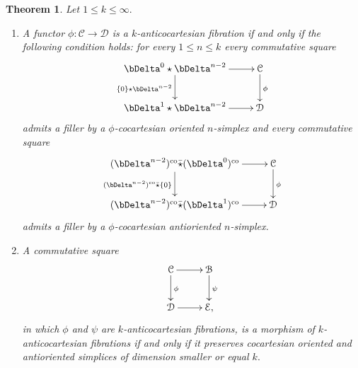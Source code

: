 \documentclass[10pt,oneside]{article}
\numberwithin{equation}{section} %
\numberwithin{figure}{section} %
\theoremstyle{plain}
\newtheorem{theorem}{Theorem}[subsection]
\theoremstyle{definition}
\newcommand{\mB}{{\mathcal B}}
\newcommand{\mC}{{\mathcal C}}
\newcommand{\mD}{{\mathcal D}}
\newcommand{\mE}{{\mathcal E}}
\newcommand{\co}{\mathrm{co}}
\begin{document}
\begin{theorem}\label{T1}
Let $1 \leq k \leq \infty.$
\begin{enumerate}[\normalfont(1)]\setlength{\itemsep}{-2pt}
\item A functor $\phi:\mC \to \mD$ is a $k$-anticocartesian fibration if and only if the following condition holds:
for every $1 \leq n \leq k$ every commutative square
\begin{equation}\label{filler0}
\begin{xy}
\xymatrix{
\bDelta^0 \star \bDelta^{n-2} \ar[d]_{\{0\}\star \bDelta^{n-2}} \ar[r]
& \mC \ar[d]^\phi
\\ 
\bDelta^1 \star \bDelta^{n-2} \ar[r] & \mD
}
\end{xy}\end{equation}
admits a filler by a $\phi$-cocartesian oriented $n$-simplex and every commutative square
\begin{equation}\label{filler1.2}
\begin{xy}
\xymatrix{(\bDelta^{n-2})^\co \bar{\star} (\bDelta^0)^\co \ar[d]_{(\bDelta^{n-2})^\co \bar{\star} \{0\}} \ar[r]
& \mC \ar[d]^\phi
\\ 
(\bDelta^{n-2})^\co \bar{\star} (\bDelta^1)^\co \ar[r] & \mD
}
\end{xy}\end{equation}
admits a filler by a $\phi$-cocartesian antioriented $n$-simplex.

\vspace{1mm}

\item A commutative square 
\begin{equation}\label{sqq}
\begin{xy}
\xymatrix{
\mC \ar[d]^\phi \ar[r]
& \mB \ar[d]^\psi
\\ 
\mD \ar[r] & \mE,
}
\end{xy}\end{equation}
in which $\phi$ and $\psi$ are $k$-anticocartesian fibrations, is a morphism of $k$-anticocartesian fibrations if and only if it preserves cocartesian oriented and antioriented simplices of dimension smaller or equal $k.$
\end{enumerate}

\end{theorem}
\end{document}
